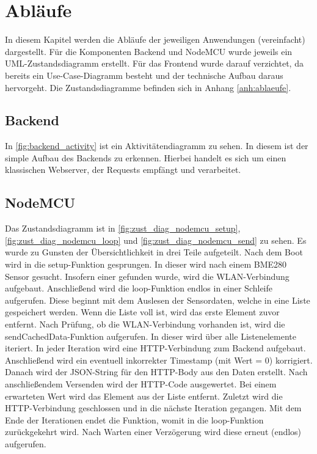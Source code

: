 

\section{Abläufe}\label{Ablaeufe}
In diesem Kapitel werden die Abläufe der jeweiligen Anwendungen (vereinfacht) dargestellt. Für die Komponenten
Backend und NodeMCU wurde jeweils ein UML-Zustandsdiagramm erstellt. Für das Frontend wurde darauf verzichtet, da bereits
ein Use-Case-Diagramm besteht und der technische Aufbau daraus hervorgeht. Die Zustandsdiagramme befinden sich in Anhang
\ref{anh:ablaeufe}.

\subsection{Backend}
In \autoref{fig:backend_activity} ist ein Aktivitätendiagramm zu sehen. In diesem ist der simple Aufbau des Backends
zu erkennen. Hierbei handelt es sich um einen klassischen Webserver, der Requests empfängt und verarbeitet.

\subsection{NodeMCU}
Das Zustandsdiagramm ist in \autoref{fig:zust_diag_nodemcu_setup}, \autoref{fig:zust_diag_nodemcu_loop} und
\autoref{fig:zust_diag_nodemcu_send} zu sehen. Es wurde zu Gunsten der Übersichtlichkeit in drei Teile aufgeteilt.
Nach dem Boot wird in die setup-Funktion gesprungen.
In dieser wird nach einem BME280 Sensor gesucht.
Insofern einer gefunden wurde, wird die WLAN-Verbindung aufgebaut.
Anschließend wird die loop-Funktion endlos in einer Schleife aufgerufen.
Diese beginnt mit dem Auslesen der Sensordaten, welche in eine Liste gespeichert werden.
Wenn die Liste voll ist, wird das erste Element zuvor entfernt.
Nach Prüfung, ob die WLAN-Verbindung vorhanden ist, wird die sendCachedData-Funktion aufgerufen.
In dieser wird über alle Listenelemente iteriert.
In jeder Iteration wird eine HTTP-Verbindung zum Backend aufgebaut.
Anschließend wird ein eventuell inkorrekter Timestamp (mit Wert = 0) korrigiert.
Danach wird der JSON-String für den HTTP-Body aus den Daten erstellt.
Nach anschließendem Versenden wird der HTTP-Code ausgewertet.
Bei einem erwarteten Wert wird das Element aus der Liste entfernt.
Zuletzt wird die HTTP-Verbindung geschlossen und in die nächste Iteration gegangen.
Mit dem Ende der Iterationen endet die Funktion, womit in die loop-Funktion zurückgekehrt wird.
Nach Warten einer Verzögerung wird diese erneut (endlos) aufgerufen.
